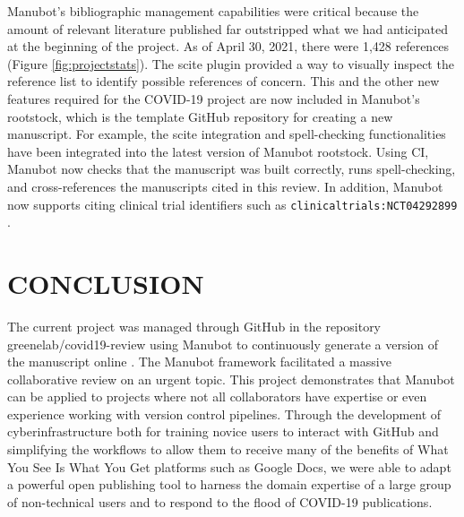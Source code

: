 \documentclass[sigconf]{acmart}
\begin{document}
Manubot's bibliographic management capabilities were critical because the amount of relevant literature published far outstripped what we had anticipated at the beginning of the project.
As of April 30, 2021, there were 1,428 references (Figure \ref{fig:projectstats}).
The scite plugin provided a way to visually inspect the reference list to identify possible references of concern.
This and the other new features required for the COVID-19 project are now included in Manubot's rootstock, which is the template GitHub repository for creating a new manuscript.
For example, the scite integration and spell-checking functionalities have been integrated into the latest version of Manubot rootstock.
Using CI, Manubot now checks that the manuscript was built correctly, runs spell-checking, and cross-references the manuscripts cited in this review.
In addition, Manubot now supports citing clinical trial identifiers such as \texttt{clinicaltrials:NCT04292899} \citep{yTCAmOyt}.

\hypertarget{conclusion}{%
\section{CONCLUSION}\label{conclusion}}

The current project was managed through GitHub in the repository greenelab/covid19-review using Manubot \citep{YuJbg3zO} to continuously generate a version of the manuscript online \citep{yTsmmAYC}.
The Manubot framework facilitated a massive collaborative review on an urgent topic.
This project demonstrates that Manubot can be applied to projects where not all collaborators have expertise or even experience working with version control pipelines.
Through the development of cyberinfrastructure both for training novice users to interact with GitHub and simplifying the workflows to allow them to receive many of the benefits of What You See Is What You Get platforms such as Google Docs, we were able to adapt a powerful open publishing tool to harness the domain expertise of a large group of non-technical users and to respond to the flood of COVID-19 publications.
\end{document}
